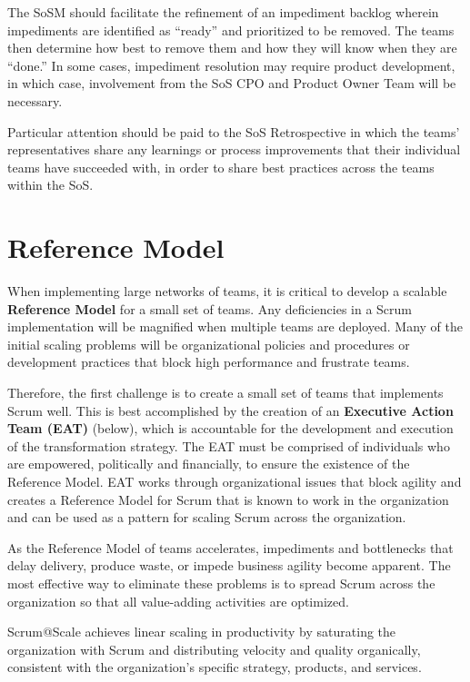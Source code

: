 \documentclass[12pt,a4paper,parskip=full]{scrartcl}
\begin{document}
The SoSM should facilitate the refinement of an impediment backlog wherein impediments are identified as ``ready'' and prioritized to be removed. The teams then determine how best to remove them and how they will know when they are ``done.'' In some cases, impediment resolution may require product development, in which case, involvement from the SoS CPO and Product Owner Team will be necessary.


Particular attention should be paid to the SoS Retrospective in which the teams' representatives share any learnings or process improvements that their individual teams have succeeded with, in order to share best practices across the teams within the SoS.  

\section{Reference Model}

When implementing large networks of teams, it is critical to develop a scalable \textbf{Reference Model} for a small set of teams. Any deficiencies in a Scrum implementation will be magnified when multiple teams are deployed. Many of the initial scaling problems will be organizational policies and procedures or development practices that block high performance and frustrate teams. 

Therefore, the first challenge is to create a small set of teams that implements Scrum well.  This is best accomplished by the creation of an \textbf{Executive Action Team (EAT)} (below), which is accountable for the development and execution of the transformation strategy.  The EAT must be comprised of individuals who are empowered, politically and financially, to ensure the existence of the Reference Model. EAT works through organizational issues that block agility and creates a Reference Model for Scrum that is known to work in the organization and can be used as a pattern for scaling Scrum across the organization.

As the Reference Model of teams accelerates, impediments and bottlenecks that delay delivery, produce waste, or impede business agility become apparent. The most effective way to eliminate these problems is to spread Scrum across the organization so that all value-adding activities are optimized.

Scrum@Scale achieves linear scaling in productivity by saturating the organization with Scrum and distributing velocity and quality organically, consistent with the organization's specific strategy, products, and services.
\end{document}
